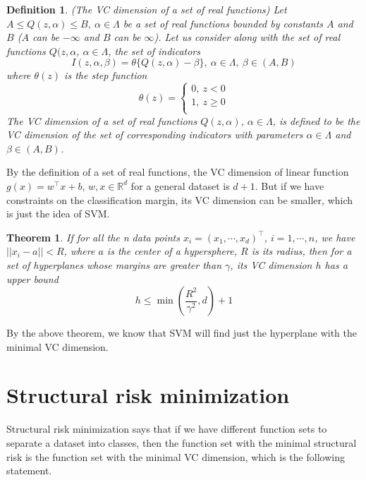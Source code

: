 \documentclass[a4paper]{report}
\newtheorem{theorem}{Theorem}[section]
\newtheorem{definition}{Definition}[section]
\begin{document}
\begin{definition}
    (The VC dimension of a set of real functions\cite{vapnik2013nature}) Let $A\leq Q(z,\alpha)\leq B,\ \alpha\in \Lambda$ be a set of real functions bounded by constants $A$ and $B$ ($A$ can be $-\infty$ and $B$ can be $\infty$).
    Let us consider along with the set of real functions $Q(z,\alpha$, $\alpha\in \Lambda$, the set of indicators
    \[
        I(z,\alpha,\beta)=\theta\{Q(z,\alpha)-\beta\},\ \alpha\in\Lambda, \ \beta\in(A,B)
    \]
    where $\theta(z)$ is the step function
    \[
        \theta(z)=
        \begin{cases}
            0,\ z<0 \\
            1,\ z\geq 0\\
        \end{cases}
    \]
    The VC dimension of a set of real functions $Q(z,\alpha)$, $\alpha\in \Lambda$, is defined to be the VC dimension of the set of corresponding indicators with parameters $\alpha\in\Lambda$ and $\beta\in(A,B)$.
\end{definition}

By the definition of a set of real functions, the VC dimension of linear function $g(x)=w^\top x+b$, $w,x\in\mathbb R^d$ for a general dataset is $d+1$. But if we have constraints on the classification margin, its VC dimension can be smaller, which is just the idea of SVM.

\begin{theorem}
    If for all the n data points $x_i=(x_1,\cdots,x_d)^\top$, $i=1,\cdots,n$, we have $||x_i-a||<R$, where $a$ is the center of a hypersphere, $R$ is its radius, then for a set of hyperplanes whose margins are greater than $\gamma$, its VC dimension $h$ has a upper bound
    \[
        h\leq \min(\frac{R^2}{\gamma^2},d)+1
    \]
\end{theorem}

By the above theorem, we know that SVM will find just the hyperplane with the minimal VC dimension.

\section{Structural risk minimization}

Structural risk minimization says that if we have different function sets to separate a dataset into classes, then the function set with the minimal structural risk is the function set with the minimal VC dimension, which is the following statement.
\end{document}
